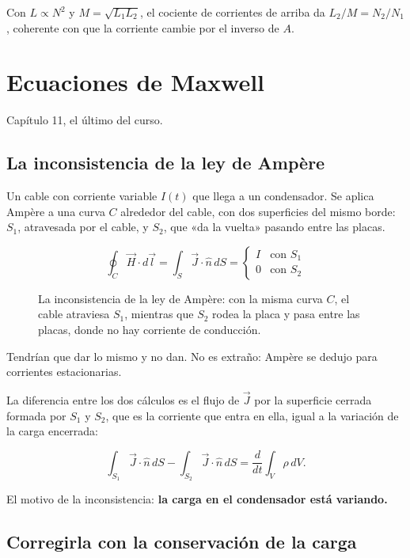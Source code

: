 \documentclass[12pt,a4paper]{article}
\begin{document}
\begin{notebox}
Con $L\propto N^2$ y $M = \sqrt{L_1L_2}$, el cociente de corrientes de arriba
da $L_2/M = N_2/N_1$, coherente con que la corriente cambie por el inverso de
$A$.
\end{notebox}

\section{Ecuaciones de Maxwell}

Capítulo 11, el último del curso.

\subsection{La inconsistencia de la ley de Ampère}

Un cable con corriente variable $I(t)$ que llega a un condensador. Se aplica
Ampère a una curva $C$ alrededor del cable, con dos superficies del mismo borde:
$S_1$, atravesada por el cable, y $S_2$, que «da la vuelta» pasando entre las
placas.

\[
\oint_C \vec H\cdot d\vec l = \int_S \vec J\cdot\hat n\,dS =
\begin{cases} I & \text{con } S_1\\ 0 & \text{con } S_2 \end{cases}
\]

\begin{figure}[H]
  \centering
  
  \caption{La inconsistencia de la ley de Ampère: con la misma curva $C$, el cable atraviesa $S_1$, mientras que $S_2$ rodea la placa y pasa entre las placas, donde no hay corriente de conducción.}
\end{figure}

Tendrían que dar lo mismo y no dan. No es extraño: Ampère se dedujo para
corrientes estacionarias.

La diferencia entre los dos cálculos es el flujo de $\vec J$ por la superficie
cerrada formada por $S_1$ y $S_2$, que es la corriente que entra en ella, igual
a la variación de la carga encerrada:

\[
\int_{S_1}\vec J\cdot\hat n\,dS - \int_{S_2}\vec J\cdot\hat n\,dS
= \frac{d}{dt}\int_V\rho\,dV .
\]

El motivo de la inconsistencia: \textbf{la carga en el condensador está variando.}

\subsection{Corregirla con la conservación de la carga}
\end{document}

